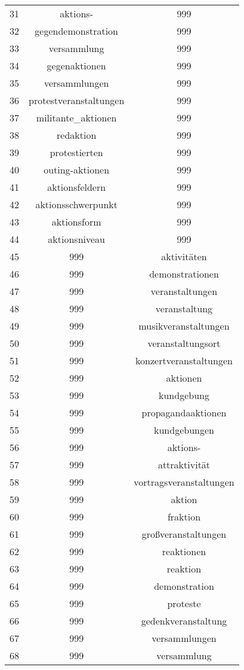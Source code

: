 \begin{table}[!htbp]
\begin{tabular}{@{\extracolsep{5pt}} ccc}
31 & aktions- & 999 \\ 
32 & gegendemonstration & 999 \\ 
33 & versammlung & 999 \\ 
34 & gegenaktionen & 999 \\ 
35 & versammlungen & 999 \\ 
36 & protestveranstaltungen & 999 \\ 
37 & militante\_aktionen & 999 \\ 
38 & redaktion & 999 \\ 
39 & protestierten & 999 \\ 
40 & outing-aktionen & 999 \\ 
41 & aktionsfeldern & 999 \\ 
42 & aktionsschwerpunkt & 999 \\ 
43 & aktionsform & 999 \\ 
44 & aktionsniveau & 999 \\ 
45 & 999 & aktivitäten \\ 
46 & 999 & demonstrationen \\ 
47 & 999 & veranstaltungen \\ 
48 & 999 & veranstaltung \\ 
49 & 999 & musikveranstaltungen \\ 
50 & 999 & veranstaltungsort \\ 
51 & 999 & konzertveranstaltungen \\ 
52 & 999 & aktionen \\ 
53 & 999 & kundgebung \\ 
54 & 999 & propagandaaktionen \\ 
55 & 999 & kundgebungen \\ 
56 & 999 & aktions- \\ 
57 & 999 & attraktivität \\ 
58 & 999 & vortragsveranstaltungen \\ 
59 & 999 & aktion \\ 
60 & 999 & fraktion \\ 
61 & 999 & großveranstaltungen \\ 
62 & 999 & reaktionen \\ 
63 & 999 & reaktion \\ 
64 & 999 & demonstration \\ 
65 & 999 & proteste \\ 
66 & 999 & gedenkveranstaltung \\ 
67 & 999 & versammlungen \\ 
68 & 999 & versammlung \\ 

\end{tabular}
\end{table}
